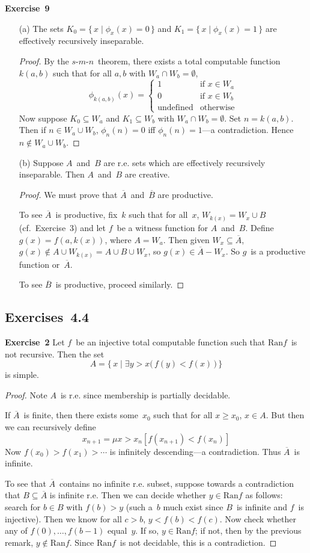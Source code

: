\documentclass[letterpaper]{article}
\newcommand{\exercise}[2][]{\noindent\textbf{Exercise~{#2}}\ifthenelse{\isempty{#1}}{\textbf{.}}{ ({#1})\textbf{.}}}
\newcommand{\union}{\cup}
\newcommand{\sect}{\cap}
\newcommand{\ran}{\mathrm{Ran}}
\newcommand{\smn}{$s$-$m$-$n$}
\theoremstyle{plain}
\theoremstyle{definition}
\theoremstyle{remark}
\begin{document}
\exercise{9}
\begin{enumerate}[itemsep=0pt]
\item[(a)] The sets $K_0=\{\,x\mid\phi_x(x)=0\,\}$ and $K_1=\{\,x\mid\phi_x(x)=1\,\}$ are effectively recursively inseparable.
\begin{proof}
By the \smn\ theorem, there exists a total computable function $k(a,b)$ such that for all $a,b$ with $W_a\sect W_b=\emptyset$,
$$\phi_{k(a,b)}(x)=\begin{cases}
1&\text{if }x\in W_a\\
0&\text{if }x\in W_b\\
\text{undefined}&\text{otherwise}
\end{cases}$$
Now suppose $K_0\subseteq W_a$ and $K_1\subseteq W_b$ with $W_a\sect W_b=\emptyset$. Set $n=k(a,b)$. Then if $n\in W_a\union W_b$, $\phi_n(n)=0$ iff $\phi_n(n)=1$---a contradiction. Hence $n\not\in W_a\union W_b$.
\end{proof}
\item[(b)] Suppose $A$~and~$B$ are r.e. sets which are effectively recursively inseparable. Then $A$~and~$B$ are creative.
\begin{proof}
We must prove that $\overline{A}$~and~$\overline{B}$ are productive.

To see $\overline{A}$~is productive, fix~$k$ such that for all~$x$, $W_{k(x)}=W_x\union B$ (cf.~Exercise~3) and let $f$~be a witness function for $A$~and~$B$. Define $g(x)=f(a,k(x))$, where $A=W_a$. Then given $W_x\subseteq\overline{A}$, $g(x)\not\in A\union W_{k(x)}=A\union B\union W_x$, so $g(x)\in\overline{A}-W_x$. So $g$~is a productive function or~$\overline{A}$.

To see $\overline{B}$~is productive, proceed similarly.
\end{proof}
\end{enumerate}

\subsection*{Exercises~4.4}
\exercise{2}
Let $f$~be an injective total computable function such that $\ran f$~is not recursive. Then the set
$$A=\bigl\{\,x\mid\exists y>x\bigl(\,f(y)<f(x)\,\bigr)\,\bigr\}$$
is simple.
\begin{proof}
Note $A$~is r.e. since membership is partially decidable.

If $\overline{A}$~is finite, then there exists some~$x_0$ such that for all $x\ge x_0$, $x\in A$. But then we can recursively define
$$x_{n+1}=\mu x>x_n[f(x_{n+1})<f(x_n)]$$
Now $f(x_0)>f(x_1)>\cdots$ is infinitely descending---a contradiction. Thus $\overline{A}$~is infinite.

To see that $\overline{A}$~contains no infinite r.e. subset, suppose towards a contradiction that $B\subseteq\overline{A}$ is infinite r.e. Then we can decide whether $y\in\ran f$ as follows: search for $b\in B$ with $f(b)>y$ (such a~$b$ much exist since $B$~is infinite and $f$~is injective). Then we know for all $c>b$, $y<f(b)<f(c)$. Now check whether any of $f(0),\ldots,f(b-1)$ equal~$y$. If so, $y\in\ran f$; if not, then by the previous remark, $y\not\in\ran f$. Since $\ran f$~is not decidable, this is a contradiction.
\end{proof}
\end{document}
